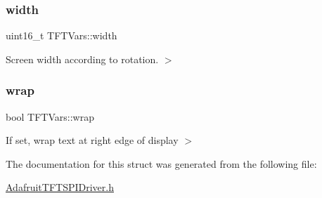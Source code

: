 \subsubsection{\texorpdfstring{width}{width}}
{\footnotesize\ttfamily uint16\+\_\+t T\+F\+T\+Vars\+::width}

Screen width according to rotation. $>$ \mbox{\label{struct_t_f_t_vars_a4ace5fa1c8cd6f56555a77bf8059bc0b}} 
\subsubsection{\texorpdfstring{wrap}{wrap}}
{\footnotesize\ttfamily bool T\+F\+T\+Vars\+::wrap}

If set, \textquotesingle{}wrap\textquotesingle{} text at right edge of display $>$ 

The documentation for this struct was generated from the following file\+:\begin{DoxyCompactItemize}
\item 
\mbox{\hyperlink{_adafruit_t_f_t_s_p_i_driver_8h}{Adafruit\+T\+F\+T\+S\+P\+I\+Driver.\+h}}\end{DoxyCompactItemize}
